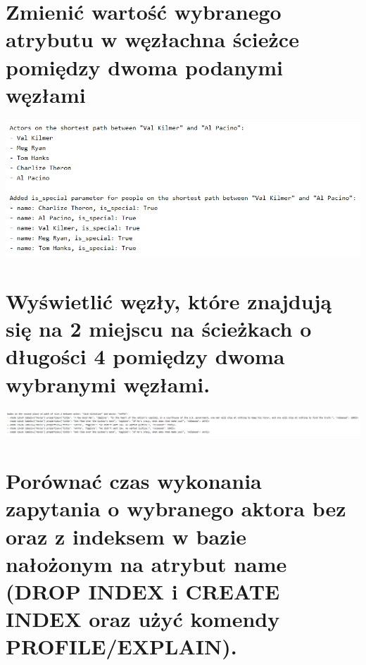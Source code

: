 \documentclass[a4paper, 11pt]{article}
\begin{document}
    \newpage

    \section{}

    \section{ Zmienić wartość wybranego atrybutu w węzłachna ścieżce pomiędzy dwoma podanymi węzłami}

    

    \begin{center}
        \includegraphics[scale=0.8]{images/task9.png}
    \end{center}

    \newpage

    \section{ Wyświetlić węzły, które znajdują się na 2 miejscu na ścieżkach o długości 4 pomiędzy dwoma
    wybranymi węzłami.}

    

    \begin{center}
        \includegraphics[scale=0.55]{images/task10.png}
    \end{center}

    \newpage

    \section{ Porównać czas wykonania zapytania o wybranego aktora bez oraz z indeksem w bazie nałożonym na
    atrybut name (DROP INDEX i CREATE INDEX oraz użyć komendy PROFILE/EXPLAIN).}
\end{document}
